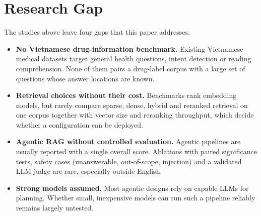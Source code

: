 \section{Research Gap}\label{sec:gap}

The studies above leave four gaps that this paper addresses.
\begin{itemize}
\item \textbf{No Vietnamese drug-information benchmark.} Existing Vietnamese medical datasets target general health questions, intent detection or reading comprehension. None of them pairs a drug-label corpus with a large set of questions whose answer locations are known.
\item \textbf{Retrieval choices without their cost.} Benchmarks rank embedding models, but rarely compare sparse, dense, hybrid and reranked retrieval on one corpus together with vector size and reranking throughput, which decide whether a configuration can be deployed.
\item \textbf{Agentic RAG without controlled evaluation.} Agentic pipelines are usually reported with a single overall score. Ablations with paired significance tests, safety cases (unanswerable, out-of-scope, injection) and a validated LLM judge are rare, especially outside English.
\item \textbf{Strong models assumed.} Most agentic designs rely on capable LLMs for planning. Whether small, inexpensive models can run such a pipeline reliably remains largely untested.
\end{itemize}
